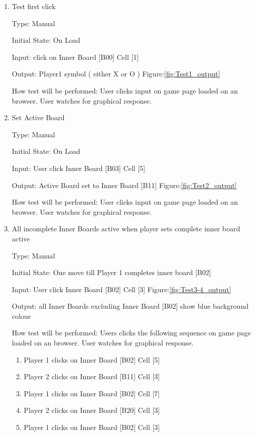 \documentclass[12pt, titlepage]{article}
\begin{document}
\begin{enumerate}

\item{Test first click\\}

Type: Manual
					
Initial State: On Load
					
Input: click on Inner Board [B00] Cell [1] 
					
Output: Player1 symbol ( either X or O ) Figure:\ref{fig:Test1_output}
					
How test will be performed: User clicks input on game page loaded on an browser. User watches for graphical response.

\item{Set Active Board\\}

Type: Manual
					
Initial State: On Load
					
Input: User click Inner Board [B03] Cell [5] 
					
Output:  Active Board set to Inner Board [B11] Figure:\ref{fig:Test2_output}
					
How test will be performed: User clicks input on game page loaded on an browser. User watches for graphical response. 


\item{All incomplete Inner Boards active when player sets complete inner board active \\}

Type: Manual
					
Initial State: One move till Player 1 completes inner board [B02]
					
Input: User click Inner Board [B02] Cell [3] Figure:\ref{fig:Test3-4_output}
					
Output:  all Inner Boards excluding Inner Board [B02] show blue background colour
					
How test will be performed: Users clicks the following sequence on game page loaded on an browser. User watches for graphical response.
\begin{enumerate}
	\item Player 1 clicks on Inner Board [B02] Cell [5]
	\item Player 2 clicks on Inner Board [B11] Cell [3]
	\item Player 1 clicks on Inner Board [B02] Cell [7]
	\item Player 2 clicks on Inner Board [B20] Cell [3]
	\item Player 1 clicks on Inner Board [B02] Cell [3]
\end{enumerate}



\end{enumerate}
\end{document}
